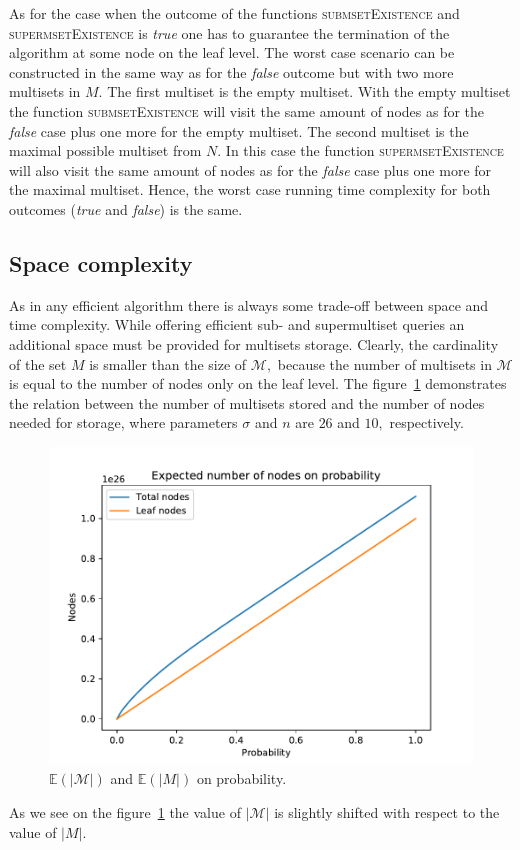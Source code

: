 \documentclass[10pt,letterpaper]{article}
\begin{document}
As for the case when the outcome of the functions \textsc{submsetExistence} and 
\textsc{supermsetExistence} is \emph{true} one has to guarantee the termination 
of the algorithm at some node on the leaf level. The worst case scenario can be 
constructed in the same way as for the \emph{false} outcome but with two more 
multisets in $M.$ The first multiset is the empty multiset. With the empty multiset 
the function \textsc{submsetExistence} will visit the same amount of nodes as for 
the \emph{false} case plus one more for the empty multiset. The second multiset 
is the maximal possible multiset from $N.$ In this case the function \textsc{supermsetExistence} 
will also visit the same amount of nodes as for the \emph{false} case plus one more 
for the maximal multiset. Hence, the worst case running time complexity for both 
outcomes (\emph{true} and \emph{false}) is the same.

\subsection{Space complexity}\label{s:spacecomplexity}
As in any efficient algorithm there is always some trade-off between space and 
time complexity. While offering efficient sub- and supermultiset queries an 
additional space must be provided for multisets storage. Clearly, the cardinality 
of the set $M$ is smaller than the size of $\mathcal{M},$ because the number 
of multisets in $\mathcal{M}$ is equal to the number of nodes only on the leaf 
level. The figure~\ref{f:exp-nodes} demonstrates the relation between the number 
of multisets stored and the number of nodes needed for storage, where parameters 
$\sigma$ and $n$ are $26$ and $10,$ respectively.

\begin{figure}[h!]
\center
\includegraphics[width=.4\textwidth, keepaspectratio]{exp-nodes-on-probab.pdf}
\caption{$\mathbb{E}(|\mathcal{M}|)$ and $\mathbb{E}(|M|)$ on probability.}
\label{f:exp-nodes}
\end{figure}

As we see on the figure~\ref{f:exp-nodes} the value of $|\mathcal{M}|$ is slightly 
shifted with respect to the value of $|M|.$
\end{document}
